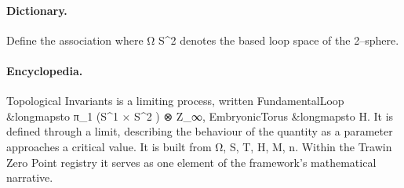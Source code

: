 \paragraph{Dictionary.}
Define the association where Ω S\textasciicircum{}2 denotes the based loop space of the 2–sphere.

\paragraph{Encyclopedia.}
Topological Invariants is a limiting process, written FundamentalLoop \&longmapsto π\_1 (S\textasciicircum{}1 × S\textasciicircum{}2 ) ⊗ Z\_∞, EmbryonicTorus \&longmapsto H. It is defined through a limit, describing the behaviour of the quantity as a parameter approaches a critical value. It is built from Ω, S, T, H, M, n. Within the Trawin Zero Point registry it serves as one element of the framework's mathematical narrative.
